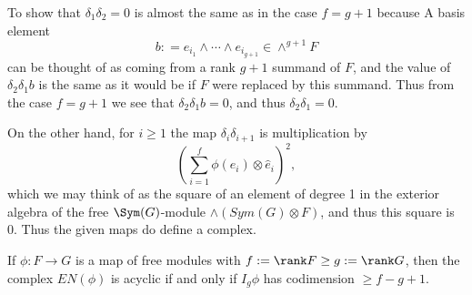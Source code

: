 To show that $\delta_{1}\delta_{2} = 0$ is almost the same as in the case $f = g+1$ because
A basis element 
$$
b: = e_{i_{1}}\wedge \cdots \wedge e_{i_{g+1}} \in \wedge^{g+1}F
$$
can be thought of as coming from a rank $g+1$ summand of $F$, and the value of $\delta_{2}\delta_{1}b$
is the same as it would be if $F$ were replaced by this summand. Thus from the case $f=g+1$ we see
that $\delta_{2}\delta_{1}b = 0$, and thus $\delta_{2}\delta_{1} = 0$.

On the other hand, for $i\geq 1$ the map $\delta_{i}\delta_{i+1}$ is multiplication by
$$
(\sum_{i = 1}^{f} \phi(e_{i}) \otimes \hat e_{i})^{2},
$$
which we may think of as the square of an element of degree 1 in the exterior algebra
of the free $\Sym(G)$-module $\wedge(Sym(G)\otimes F)$, and thus this square is 0.
Thus the given maps do define a complex.

\begin{theorem}
If $\phi: F\to G$ is a map of free modules with $f:= \rank F\geq g:= \rank G$, then the complex 
$EN(\phi)$ is acyclic if and only if $I_{g}\phi$ has codimension $\geq f-g+1$.
\end{theorem}

